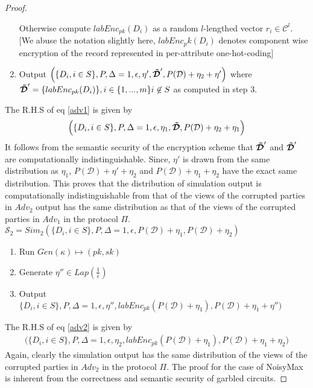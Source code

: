\begin{proof}
\begin{enumerate}
Otherwise compute $labEnc_{pk}(D_i)$ as a random $l$-lengthed vector $r_i \in \mathcal{C}^l$. [We abuse the notation slightly here, $labEnc_pk(D_i)$ denotes component wise encryption of the record represented in per-attribute one-hot-coding]
\item Output $\Big(\{D_i, i \in S\},P,\Delta=1,\epsilon,\eta',\boldsymbol{\tilde{\mathcal{D}}}',P(\mathcal{D})+\eta_2+\eta'\Big)$ where $\boldsymbol{\tilde{\mathcal{D}}}'=\{labEnc_{pk}(D_i)\},i \in \{1,...,m\} i \not \in S$ as computed in step 3.
\end{enumerate}
The R.H.S of eq \ref{adv1}  is given by 
\begin{gather}\Big(\{D_i, i \in S\},P,\Delta=1,\epsilon, \eta_1,\boldsymbol{\tilde{\mathcal{D}}},P(\mathcal{D})+\eta_2+\eta_1\Big)\end{gather}
It follows from the semantic security of the encryption scheme that $\boldsymbol{\tilde{\mathcal{D}}}'$ and $\boldsymbol{\tilde{\mathcal{D}}}'$ are computationally indistinguishable.
Since, $\eta'$ is drawn from the same distribution as $\eta_1$, $P(\mathcal{D})+\eta'+\eta_2$ and $P(\mathcal{D})+\eta_1+\eta_2$ have the exact same distribution. This proves that the distribution of simulation output is computationally indistinguishable from that of the views of the corrupted parties in $Adv_2$
output has the same distribution as that of the views of the corrupted parties in $Adv_1$ in the
protocol $\Pi$.\\
$\mathcal{S}_2=Sim_2(\{D_i, i \in S\},P,\Delta=1,\epsilon,P(\mathcal{D})+\eta_1,P(\mathcal{D})+\eta_2)$
\begin{enumerate}\item Run $Gen(\kappa)\mapsto (pk,sk)$ \item Generate $\eta'' \in Lap(\frac{1}{\epsilon})$ \item Output $\Big\{D_i, i \in S\},P,\Delta=1,\epsilon, \eta'', labEnc_{pk}(P(\mathcal{D})+\eta_1), P(\mathcal{D})+\eta_1+\eta''\Big)$
\end{enumerate}
The R.H.S of eq \ref{adv2} is given by \begin{gather}\Big(\{D_i, i \in S\},P,\Delta=1,\epsilon,\eta_2,labEnc_{pk}(P(\mathcal{D})+\eta_1),P(\mathcal{D})+\eta_1+\eta_2\Big)\end{gather}
Again, clearly the simulation output has the same distribution of the
views of the corrupted parties in $Adv_2$ in the protocol $\Pi$. 
The proof for the case of NoisyMax is inherent from the correctness and semantic security of garbled circuits.
\end{proof}
